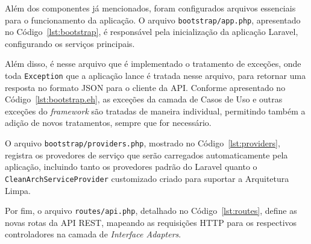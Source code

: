     
    
    \par Além dos componentes já mencionados, foram configurados arquivos essenciais para o funcionamento da aplicação. O arquivo \texttt{bootstrap/app.php}, apresentado no Código~\ref{lst:bootstrap}, é responsável pela inicialização da aplicação Laravel, configurando os serviços principais.
    
    

    \par Além disso, é nesse arquivo que é implementado o tratamento de exceções, onde toda \texttt{Exception} que a aplicação lance é tratada nesse arquivo, para retornar uma resposta no formato JSON para o cliente da API. Conforme apresentado no Código~\ref{lst:bootstrap.eh}, as exceções da camada de Casos de Uso e outras exceções do \textit{framework} são tratadas de maneira individual, permitindo também a adição de novos tratamentos, sempre que for necessário.

    
    
    \par O arquivo \texttt{bootstrap/providers.php}, mostrado no Código~\ref{lst:providers}, registra os provedores de serviço que serão carregados automaticamente pela aplicação, incluindo tanto os provedores padrão do Laravel quanto o \texttt{CleanArchServiceProvider} customizado criado para suportar a Arquitetura Limpa.
    
    
    
    \par Por fim, o arquivo \texttt{routes/api.php}, detalhado no Código~\ref{lst:routes}, define as novas rotas da API REST, mapeando as requisições HTTP para os respectivos controladores na camada de \textit{Interface Adapters}.
    
